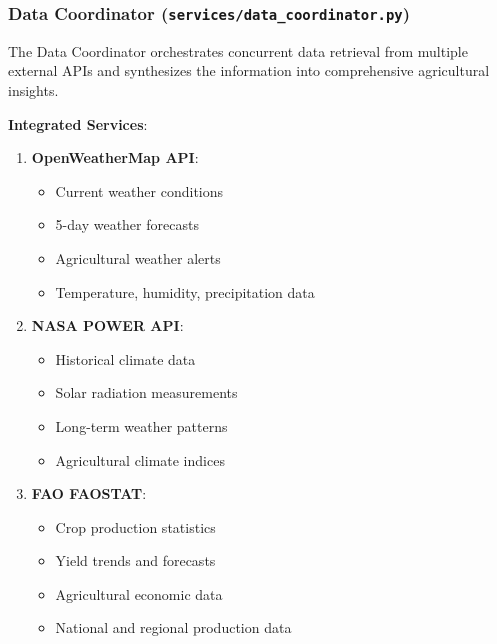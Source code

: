 \documentclass[12pt,a4paper]{article}
\begin{document}
\subsubsection{Data Coordinator (\texttt{services/data\_coordinator.py})}

The Data Coordinator orchestrates concurrent data retrieval from multiple external APIs and synthesizes the information into comprehensive agricultural insights.

\textbf{Integrated Services}:
\begin{enumerate}[leftmargin=*]
    \item \textbf{OpenWeatherMap API}:
    \begin{itemize}
        \item Current weather conditions
        \item 5-day weather forecasts
        \item Agricultural weather alerts
        \item Temperature, humidity, precipitation data
    \end{itemize}

    \item \textbf{NASA POWER API}:
    \begin{itemize}
        \item Historical climate data
        \item Solar radiation measurements
        \item Long-term weather patterns
        \item Agricultural climate indices
    \end{itemize}

    \item \textbf{FAO FAOSTAT}:
    \begin{itemize}
        \item Crop production statistics
        \item Yield trends and forecasts
        \item Agricultural economic data
        \item National and regional production data
    \end{itemize}
\end{enumerate}
\end{document}
